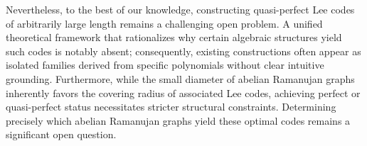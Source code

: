 \documentclass{amsart}
\numberwithin{equation}{section}
\begin{document}

Nevertheless, to the best of our knowledge, constructing quasi-perfect Lee codes of arbitrarily large length remains a challenging open problem. A unified theoretical framework that rationalizes why certain algebraic structures yield such codes is notably absent; consequently, existing constructions often appear as isolated families derived from specific polynomials without clear intuitive grounding. Furthermore, while the small diameter of abelian Ramanujan graphs inherently favors the covering radius of associated Lee codes, achieving perfect or quasi-perfect status necessitates stricter structural constraints. Determining precisely which abelian Ramanujan graphs yield these optimal codes remains a significant open question.
\end{document}
